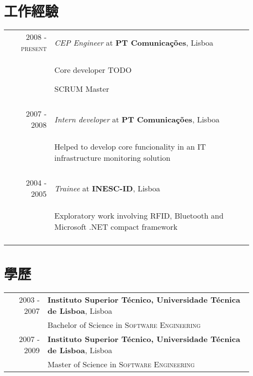 \documentclass[a4paper,10pt]{article}
\begin{document}
\section{工作經驗}
\begin{tabular}{rp{11cm}}
\textsc{2008 - present} & \emph{CEP Engineer} at \textbf{PT Comunicações}, Lisboa\\ 
   & \begin{compactitem} 
       \item Core developer TODO
       \item SCRUM Master
     \end{compactitem}\vspace{-1em} \\
\multicolumn{2}{c}{} \\

  \textsc{2007 - 2008} & \emph{Intern developer} at \textbf{PT Comunicações}, Lisboa\\ 
  & \begin{compactitem}
    \item Helped to develop core funcionality in an IT infrastructure monitoring solution
   \end{compactitem}\vspace{-1em} \\
\multicolumn{2}{c}{} \\

  \textsc{2004 - 2005} & \emph{Trainee} at \textbf{INESC-ID}, Lisboa\\ 
  & \begin{compactitem}
    \item Exploratory work involving RFID, Bluetooth and Microsoft .NET compact framework
   \end{compactitem}\vspace{-1em} \\
\multicolumn{2}{c}{} \\

\end{tabular}

\section{學歷}
\begin{tabular}{rl}	
2003 - 2007 & \textbf{Instituto Superior Técnico, Universidade Técnica de Lisboa}, Lisboa\\
 & Bachelor of Science in \textsc{Software Engineering} \\
2007 - 2009 & \textbf{Instituto Superior Técnico, Universidade Técnica de Lisboa}, Lisboa\\
 & Master of Science in \textsc{Software Engineering}
\end{tabular}
\end{document}
